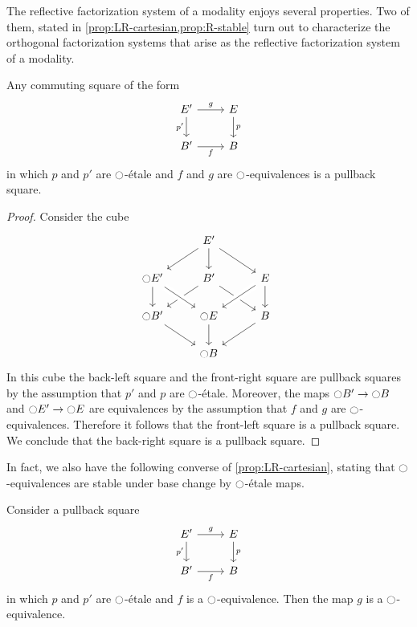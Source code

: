 \documentclass[9pt,twosided]{amsart}
\begin{document}
The reflective factorization system of a modality enjoys several properties. Two of them, stated in \cref{prop:LR-cartesian,prop:R-stable} turn out to characterize the orthogonal factorization systems that arise as the reflective factorization system of a modality.

\begin{prp}\label{prop:LR-cartesian}
  Any commuting square of the form
  \begin{equation*}
    \begin{tikzcd}
      E' \arrow[d,swap,"{p'}"] \arrow[r,"g"] & E \arrow[d,"p"] \\
      B' \arrow[r,swap,"f"] & B
    \end{tikzcd}
  \end{equation*}
  in which $p$ and $p'$ are ${\ocircle}$-\'etale and $f$ and $g$ are ${\ocircle}$-equivalences is a pullback square.
\end{prp}

\begin{proof}
  Consider the cube
  \begin{equation*}
    \begin{tikzcd}
      & E' \arrow[dl] \arrow[d] \arrow[dr] & \phantom{\modal E'} \\
      \modal E' \arrow[d] & B' \arrow[dl] \arrow[dr] & E \arrow[d] \arrow[dl,crossing over] \\
      \modal B' \arrow[dr] & \modal E \arrow[from=ul,crossing over] \arrow[d] & B \arrow[dl] \\
      & \modal B & \phantom{\modal B'}
    \end{tikzcd}
  \end{equation*}
  In this cube the back-left square and the front-right square are pullback squares by the assumption that $p'$ and $p$ are ${\ocircle}$-\'etale. Moreover, the maps ${\ocircle} B'\to{\ensuremath{\ocircle}} B$ and ${\ocircle} E'\to{\ensuremath{\ocircle}} E$ are equivalences by the assumption that $f$ and $g$ are ${\ocircle}$-equivalences. Therefore it follows that the front-left square is a pullback square. We conclude that the back-right square is a pullback square.
\end{proof}

In fact, we also have the following converse of \cref{prop:LR-cartesian}, stating that ${\ocircle}$-equivalences are stable under base change by ${\ocircle}$-\'etale maps.

\begin{prp}\label{prop:LR-cartesian-converse}
  Consider a pullback square
  \begin{equation*}
    \begin{tikzcd}
      E' \arrow[d,swap,"{p'}"] \arrow[r,"g"] & E \arrow[d,"p"] \\
      B' \arrow[r,swap,"f"] & B
    \end{tikzcd}
  \end{equation*}
  in which $p$ and $p'$ are ${\ocircle}$-\'etale and $f$ is a ${\ocircle}$-equivalence. Then the map $g$ is a ${\ocircle}$-equivalence.
\end{prp}
\end{document}
